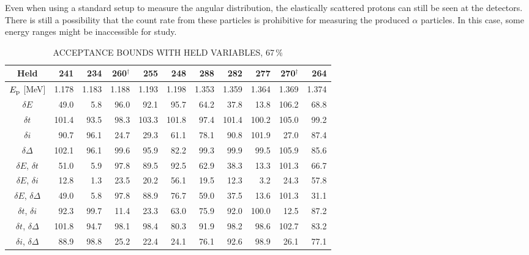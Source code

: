 Even when using a standard setup to measure the angular distribution,
the elastically scattered protons can still be seen at the detectors.
There is still a possibility that the count rate from these particles is
prohibitive for measuring the produced $\alpha$ particles. In this case,
some energy ranges might be inaccessible for study.

\begin{table}
\small
    \begin{center}
        \caption{ACCEPTANCE BOUNDS WITH HELD VARIABLES, 67\,\%}
        \label{tab:acceptance-uncertainty-67}
        \begin{tabular}{crrrrrrrrrr}
            \toprule
            \midrule
            \textbf{Held}
                & \textbf{241} & \textbf{234} & \textbf{260}$^\dagger$ & \textbf{255} & \textbf{248}
                & \textbf{288} & \textbf{282} & \textbf{277} & \textbf{270}$^\dagger$ & \textbf{264} \\
            \midrule
$E_{\rm p}$ [MeV] & 1.178 & 1.183 & 1.188 & 1.193 & 1.198 & 1.353 & 1.359 & 1.364 & 1.369 & 1.374 \\
\midrule
$\delta E$     &  49.0 &   5.8 &  96.0 &  92.1 &  95.7 &  64.2 &  37.8 &  13.8 & 106.2 &  68.8 \\
$\delta t$     & 101.4 &  93.5 &  98.3 & 103.3 & 101.8 &  97.4 & 101.4 & 100.2 & 105.0 &  99.2 \\
$\delta i$     &  90.7 &  96.1 &  24.7 &  29.3 &  61.1 &  78.1 &  90.8 & 101.9 &  27.0 &  87.4 \\
$\delta\Delta$ & 102.1 &  96.1 &  99.6 &  95.9 &  82.2 &  99.3 &  99.9 &  99.5 & 105.9 &  85.6 \\
$\delta E$, $\delta t$     &  51.0 &   5.9 &  97.8 &  89.5 &  92.5 &  62.9 &  38.3 &  13.3 & 101.3 &  66.7 \\
$\delta E$, $\delta i$     &  12.8 &   1.3 &  23.5 &  20.2 &  56.1 &  19.5 &  12.3 &   3.2 &  24.3 &  57.8 \\
$\delta E$, $\delta\Delta$ &  49.0 &   5.8 &  97.8 &  88.9 &  76.7 &  59.0 &  37.5 &  13.6 & 101.3 &  31.1 \\
$\delta t$, $\delta i$     &  92.3 &  99.7 &  11.4 &  23.3 &  63.0 &  75.9 &  92.0 & 100.0 &  12.5 &  87.2 \\
$\delta t$, $\delta\Delta$ & 101.8 &  94.7 &  98.1 &  98.4 &  80.3 &  91.9 &  98.2 &  98.6 & 102.7 &  83.2 \\
$\delta i$, $\delta\Delta$ &  88.9 &  98.8 &  25.2 &  22.4 &  24.1 &  76.1 &  92.6 &  98.9 &  26.1 &  77.1 \\

\end{tabular}
\end{center}
\end{table}
